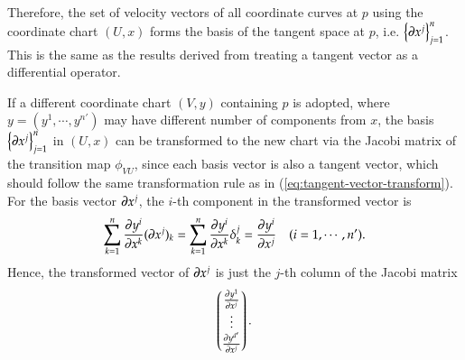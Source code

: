\documentclass[11pt, a4paper]{book}
\begin{document}
Therefore, the set of velocity vectors of all coordinate curves at $p$ using the
coordinate chart $(U,x)$ forms the basis of the tangent space at $p$, i.e.
$\left\{ \boldsymbol{\partial} x^j \right\}_{j=1}^n$. This is the same as the results derived from
treating a tangent vector as a differential operator.

If a different coordinate chart $(V,y)$ containing $p$ is adopted, where
$y = (y^1,\cdots,y^{n'})$ may have different number of components from $x$, the basis
$\left\{ \boldsymbol{\partial}x^j \right\}_{j=1}^n$ in $(U,x)$ can be transformed to the new chart
via the Jacobi matrix of the transition map $\phi_{VU}$, since each basis vector is also a
tangent vector, which should follow the same transformation rule as in
(\ref{eq:tangent-vector-transform}). For the basis vector $\boldsymbol{\partial}x^j$, the $i$-th
component in the transformed vector is
\begin{equation}
  \label{eq:tangent-space-basis-transform}
  \sum_{k=1}^n \frac{\partial y^i}{\partial x^k} (\boldsymbol{\partial} x^j)_k = \sum_{k=1}^n
  \frac{\partial y^i}{\partial x^k} \delta_k^j = \frac{\partial y^{i}}{\partial x^{j}} \quad (i=1,\cdots,n').
\end{equation}
Hence, the transformed vector of $\boldsymbol{\partial}x^j$ is just the $j$-th column of the
Jacobi matrix
$$
\begin{pmatrix}
  \frac{\partial y^{1}}{\partial x^j} \\
  \vdots \\
  \frac{\partial y^{d'}}{\partial x^j}
\end{pmatrix}.
$$
\end{document}

